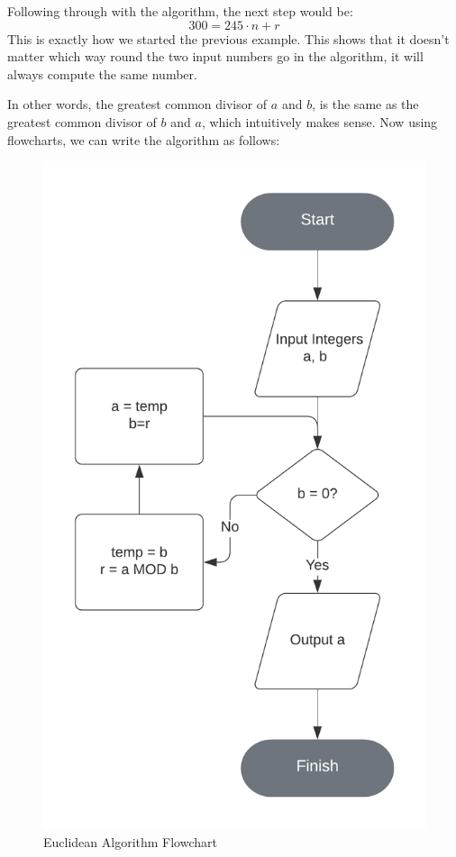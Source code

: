 \documentclass{article}
\begin{document}
Following through with the algorithm, the next step would be:
$$300 = 245 \cdot n + r$$
This is exactly how we started the previous example. This shows that it doesn't matter which way round the two input numbers go in the algorithm, it will always compute the same number.

In other words, the greatest common divisor of $a$ and $b$, is the same as the greatest common divisor of $b$ and $a$, which intuitively makes sense.
\clearpage
Now using flowcharts, we can write the algorithm as follows:

\begin{figure}[h]
    \centering
    \caption{Euclidean Algorithm Flowchart}
    \captionsetup{justification=centering}
    \includegraphics[scale=0.6]{euclidean-algorithm-flowchart}
\end{figure}
\end{document}
